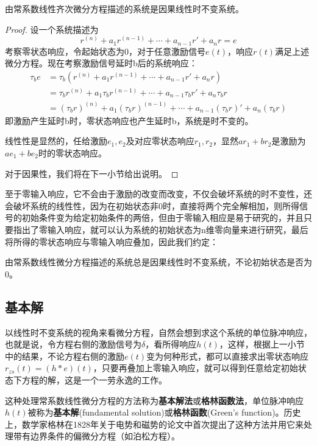 \documentclass{ctexbook}
\begin{document}
\begin{proposition}
    由常系数线性齐次微分方程描述的系统是因果线性时不变系统。
\end{proposition}
\begin{proof}
    设一个系统描述为
\[r^{(n)}+a_{1}r^{(n-1)}+\cdots +a_{n-1} r'+a_n r=e\]
考察零状态响应，令起始状态为0，对于任意激励信号$e(t)$，响应$r(t)$满足上述微分方程。现在考察激励信号延时b后的系统响应：
\begin{align*}
    \tau_b e&=\tau_b(r^{(n)}+a_{1}r^{(n-1)}+\cdots +a_{n-1} r'+a_n r)\\
    &=\tau_b r^{(n)}+a_{1}\tau_b r^{(n-1)}+\cdots +a_{n-1} \tau_b r'+a_n \tau_b r\\
    &= (\tau_b r)^{(n)}+a_{1}(\tau_b r)^{(n-1)}+\cdots +a_{n-1} (\tau_b r)'+a_n (\tau_b r)
\end{align*}
即激励产生延时b时，零状态响应也产生延时b，系统是时不变的。

线性性是显然的，任给激励$e_1,e_2$及对应零状态响应$r_1,r_2$，显然$ar_1+br_2$是激励为$ae_1+be_2$时的零状态响应。

对于因果性，我们将在下一小节给出说明。
\end{proof}
至于零输入响应，它不会由于激励的改变而改变，不仅会破坏系统的时不变性，还会破坏系统的线性性，因为在初始状态非0时，直接将两个完全解相加，则所得信号的初始条件变为给定初始条件的两倍，但由于零输入相应是易于研究的，并且只要指出了零输入响应，就可以认为系统的初始状态为n维零向量来进行研究，最后将所得的零状态响应与零输入响应叠加，因此我们约定：
\begin{definition}
    由常系数线性微分方程描述的系统总是因果线性时不变系统，不论初始状态是否为0。
\end{definition}

\subsection{基本解}\label{sub:fundamental_solution}

以线性时不变系统的视角来看微分方程，自然会想到求这个系统的单位脉冲响应，也就是说，令方程右侧的激励信号为$\delta$，看所得响应$h(t)$，这样，根据上一小节中的结果，不论方程右侧的激励$e(t)$变为何种形式，都可以直接求出零状态响应$r_{zs}(t)=(h*e)(t)$，只要再叠加上零输入响应，就可以得到任意给定初始状态下方程的解，这是一个一劳永逸的工作。

这种处理常系数线性微分方程的方法称为\textbf{基本解法}或\textbf{格林函数法}，单位脉冲响应$h(t)$被称为\textbf{基本解}(fundamental solution)或\textbf{格林函数}(Green's function)。历史上，数学家格林在1828年关于电势和磁势的论文中首次提出了这种方法并用它来处理带有边界条件的偏微分方程（如泊松方程）。
\end{document}
